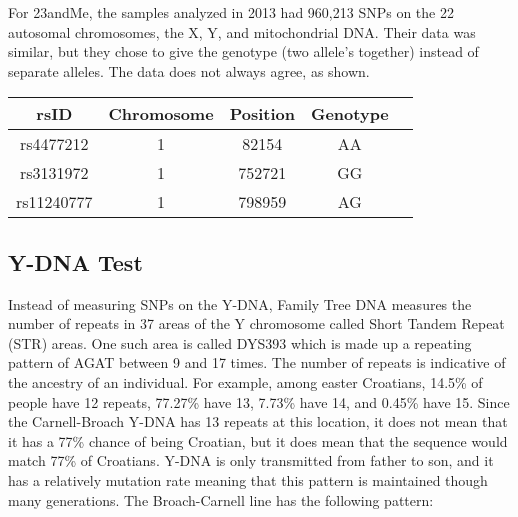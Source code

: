\documentclass[11pt,letter]{book}
\begin{document}
For 23andMe, the samples analyzed in 2013 had 960,213 SNPs on the 22 autosomal chromosomes, the X, Y, and mitochondrial DNA.  Their data was similar, but they chose to give the genotype (two allele's together) instead of separate alleles.  The data does not always agree, as shown.

\begin{center}
\begin{tabular}{c | c | c | c | c}
	rsID & Chromosome & Position & Genotype \\
	\hline
	rs4477212 & 1 & 82154 & AA \\
	rs3131972	& 1 & 752721 & GG \\
	rs11240777 & 1 & 798959 & AG \\
\end{tabular}
\end{center}

\subsection{Y-DNA Test}

Instead of measuring SNPs on the Y-DNA, Family Tree DNA measures the number of repeats in 37 areas of the Y chromosome called Short Tandem Repeat (STR) areas.  One such area is called DYS393 which is made up a repeating pattern of AGAT between 9 and 17 times.  The number of repeats is indicative of the ancestry of an individual.  For example, among easter Croatians, 14.5\% of people have 12 repeats, 77.27\% have 13, 7.73\% have 14, and 0.45\% have 15.  Since the Carnell-Broach Y-DNA has 13 repeats at this location, it does not mean that it has a 77\% chance of being Croatian, but it does mean that the sequence would match 77\% of Croatians.
Y-DNA is only transmitted from father to son, and it has a relatively mutation rate meaning that this pattern is maintained though many generations.  The Broach-Carnell line has the following pattern:
\end{document}
